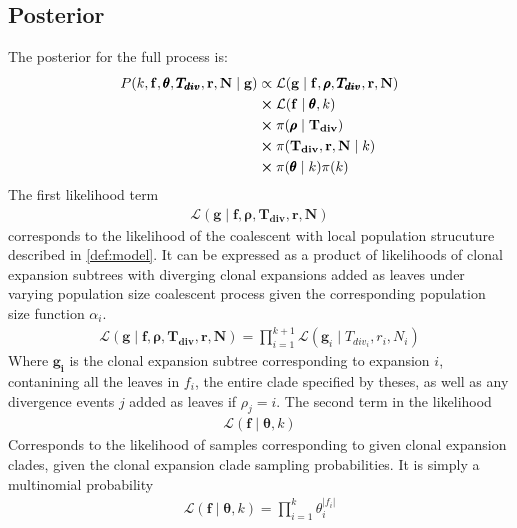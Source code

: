 \documentclass{report}
\theoremstyle{definition}
\begin{document}
\subsection{Posterior}
The posterior for the full process is:
\begin{gather}
\begin{aligned}
P(k, \mathbf{f}, \pmb{\theta}, \pmb{T_{div}}, \mathbf{r}, \mathbf{N}\mid\mathbf{g}) &\propto \mathcal{L}(\mathbf{g}\mid \mathbf{f}, \pmb{\rho}, \pmb{T_{div}}, \mathbf{r}, \mathbf{N})\\
&\cross \mathcal{L}(\mathbf{f}\mid\pmb{\theta}, k)\\
&\cross \pi(\pmb{\rho}\mid\mathbf{T_{div}})\\
&\cross \pi(\mathbf{T_{div}}, \mathbf{r}, \mathbf{N}\mid k)\\
&\cross\pi(\pmb{\theta}\mid k)\pi(k)
\end{aligned}
\end{gather}
The first likelihood term 
\begin{gather}
\mathcal{L}(\mathbf{g}\mid\mathbf{f}, \pmb{\rho}, \pmb{T_{div}}, \mathbf{r}, \mathbf{N})
\end{gather}
corresponds to the likelihood of the coalescent with local population strucuture described in \ref{def:model}. It can be expressed as a product of likelihoods of clonal expansion subtrees with diverging clonal expansions added as leaves under varying population size coalescent process given the corresponding population size function $\alpha_i$.
\begin{gather}
\mathcal{L}(\mathbf{g}\mid\mathbf{f}, \pmb{\rho}, \pmb{T_{div}}, \mathbf{r}, \mathbf{N}) = \prod\limits_{i=1}^{k+1}\mathcal{L}(\mathbf{g}_i\mid T_{div_i}, r_i, N_i)
\end{gather}
Where $\mathbf{g_i}$ is the clonal expansion subtree corresponding to expansion $i$, contanining all the leaves in $f_i$, the entire clade specified by theses, as well as any divergence events $j$ added as leaves if $\rho_j = i$.
The second term in the likelihood 
\begin{gather}
\mathcal{L}(\mathbf{f}\mid\pmb{\theta}, k)
\end{gather}
Corresponds to the likelihood of samples corresponding to given clonal expansion clades, given the clonal expansion clade sampling probabilities.
It is simply a multinomial probability
\begin{gather}
\mathcal{L}(\mathbf{f}\mid\pmb{\theta}, k) = \prod\limits_{i=1}^{k}\theta_{i}^{|f_i|}  
\end{gather}
\end{document}
